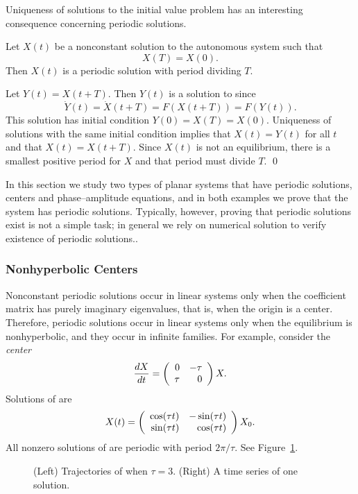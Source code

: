 \documentclass{ximera}
\begin{document}
Uniqueness of solutions to the initial 
value problem has an interesting consequence concerning periodic solutions.
\begin{lemma}  
Let $X(t)$ be a nonconstant solution to the autonomous
system  such that 
\[
X(T)=X(0).
\]
Then $X(t)$ is a periodic solution with period dividing $T$.
\end{lemma}

\proof  Let $Y(t)=X(t+T)$.  Then $Y(t)$ is a solution to 
 since 
\[
\dot{Y}(t) = \dot{X}(t+T)=F(X(t+T))=F(Y(t)).
\]
This solution has initial condition $Y(0)=X(T)=X(0)$.  
Uniqueness of solutions with the same initial condition 
implies that $X(t)=Y(t)$ for all $t$ and that $X(t)=X(t+T)$.
Since $X(t)$ is not an equilibrium, there is a smallest 
positive period for $X$ and that period must divide $T$. \qed

In this section we study two types of planar systems that have periodic 
solutions, centers and phase--amplitude equations, and in both examples 
we prove that the system has periodic solutions.  Typically, however, 
proving that periodic solutions exist is not a simple task; in general 
we rely on numerical solution to verify existence of periodic solutions..




\subsubsection*{Nonhyperbolic Centers}

Nonconstant periodic solutions occur in linear systems only when the
coefficient matrix has purely imaginary eigenvalues, that is,
when the origin is a center.  Therefore, periodic solutions
occur in linear systems only when the equilibrium is
nonhyperbolic, and they occur in infinite families.  For
example, consider the {\em center\/}  
\begin{equation}  \label{e:planeper}
\frac{dX}{dt} = \left(\begin{array}{rr} 0 & -\tau\\ \tau &0\end{array}\right)X.
\end{equation}
Solutions of  are 
\[
X(t) = \left(\begin{array}{rr} \cos(\tau t) & -\sin(\tau t)\\ \sin(\tau t) &\cos(\tau t)\end{array}\right)X_0.
\]
All nonzero solutions of  are periodic with period
$2\pi/\tau$.  See Figure~\ref{F:planarperiodic}.

\begin{figure}[htb]
           \centerline{%
           }
           \caption{(Left) Trajectories of \protect{}
	     when $\tau=3$. (Right) A time series of one solution.}
           \label{F:planarperiodic}
\end{figure}
\end{document}
